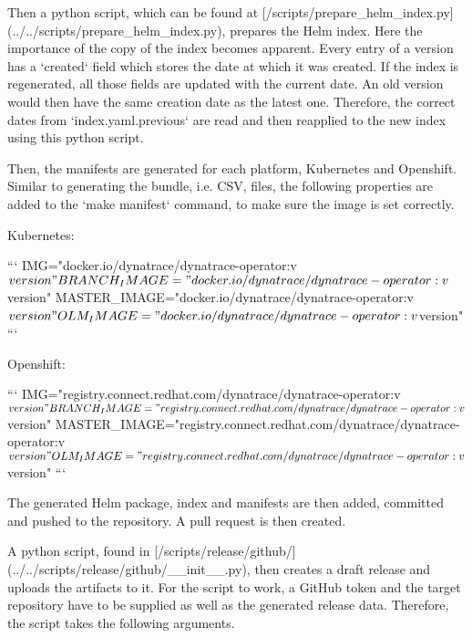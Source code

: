Then a python script, which can be found at [/scripts/prepare_helm_index.py](../../scripts/prepare_helm_index.py), prepares the Helm index.
Here the importance of the copy of the index becomes apparent.
Every entry of a version has a `created` field which stores the date at which it was created.
If the index is regenerated, all those fields are updated with the current date.
An old version would then have the same creation date as the latest one.
Therefore, the correct dates from `index.yaml.previous` are read and then reapplied to the new index using this python script.

Then, the manifests are generated for each platform, Kubernetes and Openshift.
Similar to generating the bundle, i.e. CSV, files, the following properties are added to the `make manifest` command, to make sure the image is set correctly.

Kubernetes:

```
IMG="docker.io/dynatrace/dynatrace-operator:v${version}"
BRANCH_IMAGE="docker.io/dynatrace/dynatrace-operator:v${version}"
MASTER_IMAGE="docker.io/dynatrace/dynatrace-operator:v${version}"
OLM_IMAGE="docker.io/dynatrace/dynatrace-operator:v${version}"
```

Openshift:

```
IMG="registry.connect.redhat.com/dynatrace/dynatrace-operator:v${version}"
BRANCH_IMAGE="registry.connect.redhat.com/dynatrace/dynatrace-operator:v${version}"
MASTER_IMAGE="registry.connect.redhat.com/dynatrace/dynatrace-operator:v${version}"
OLM_IMAGE="registry.connect.redhat.com/dynatrace/dynatrace-operator:v${version}"
```

The generated Helm package, index and manifests are then added, committed and pushed to the repository.
A pull request is then created.

A python script, found in [/scripts/release/github/](../../scripts/release/github/__init__.py), then creates a draft release and uploads the artifacts to it.
For the script to work, a GitHub token and the target repository have to be supplied as well as the generated release data.
Therefore, the script takes the following arguments.

